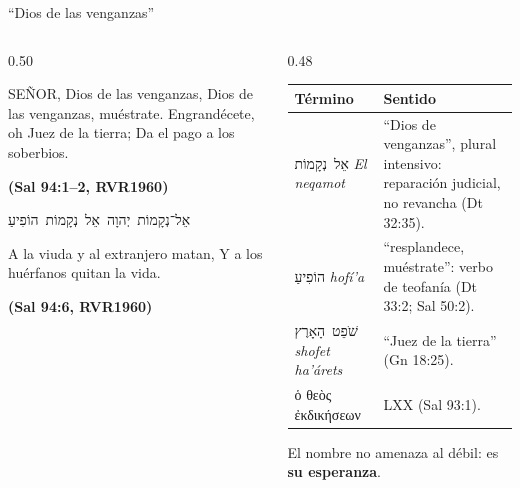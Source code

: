 \documentclass[hyperref={bookmarks=false},aspectratio=169]{beamer}
\newcommand{\heb}[1]{\mbox{\foreignlanguage{hebrew}{#1}}}
\newcommand{\grc}[1]{\foreignlanguage{ancientgreek}{#1}}
\newcommand{\SENOR}{S{\fontsize{0.78em}{1em}\selectfont EÑOR}}
\newcommand{\fuente}[1]{\par\hfill{\upshape\bfseries\footnotesize\textcolor{azul}{#1}}}
\newcommand{\destacar}[1]{\textbf{\textcolor{azul}{#1}}}
\begin{document}
\begin{frame}{``Dios de las venganzas''}
\begin{columns}[c,onlytextwidth]
\begin{column}{0.50\textwidth}
\begin{cita}\SENOR{}, Dios de las venganzas, Dios de las venganzas, muéstrate. Engrandécete, oh Juez de la tierra; Da el pago a los soberbios.\fuente{(Sal 94:1--2, RVR1960)}\end{cita}
\begin{center}\small\heb{אֵל־נְקָמוֹת יְהוָה אֵל נְקָמוֹת הוֹפִיעַ}\end{center}
\begin{cita}A la viuda y al extranjero matan, Y a los huérfanos quitan la vida.\fuente{(Sal 94:6, RVR1960)}\end{cita}
\end{column}
\begin{column}{0.48\textwidth}\scriptsize
\renewcommand{\arraystretch}{1.2}
\begin{tabular}{@{}>{\RaggedRight\arraybackslash}p{1.9cm}>{\RaggedRight\arraybackslash}p{3.8cm}@{}}
\toprule
\textbf{Término} & \textbf{Sentido} \\ \midrule
\heb{אֵל נְקָמוֹת} \emph{El neqamot} & ``Dios de venganzas'', plural intensivo: reparación judicial, no revancha (Dt 32:35). \\
\heb{הוֹפִיעַ} \emph{hofí'a} & ``resplandece, muéstrate'': verbo de teofanía (Dt 33:2; Sal 50:2). \\
\heb{שֹׁפֵט הָאָרֶץ} \emph{shofet ha'árets} & ``Juez de la tierra'' (Gn 18:25). \\
\grc{ὁ θεὸς ἐκδικήσεων} & LXX (Sal 93:1). \\
\bottomrule
\end{tabular}\par\medskip
\small El nombre no amenaza al débil: es \destacar{su esperanza}.
\end{column}
\end{columns}
\end{frame}
\end{document}
